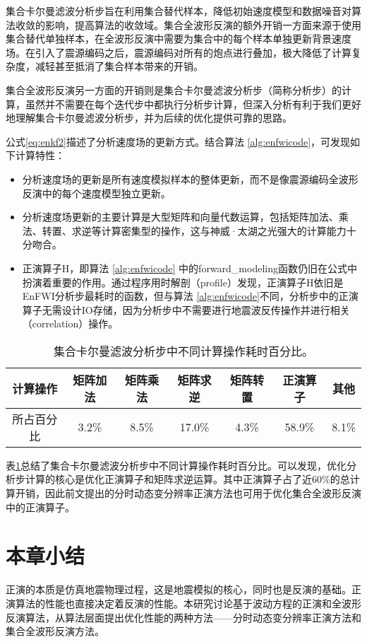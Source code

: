 集合卡尔曼滤波分析步旨在利用集合替代样本，降低初始速度模型和数据噪音对算法收敛的影响，提高算法的收敛域。集合全波形反演的额外开销一方面来源于使用集合替代单独样本，在全波形反演中需要为集合中的每个样本单独更新背景速度场。在引入了震源编码之后，震源编码对所有的炮点进行叠加，极大降低了计算复杂度，减轻甚至抵消了集合样本带来的开销。

集合全波形反演另一方面的开销则是集合卡尔曼滤波分析步（简称分析步）的计算，虽然并不需要在每个迭代步中都执行分析步计算，但深入分析有利于我们更好地理解集合卡尔曼滤波分析步，并为后续的优化提供可靠的思路。

公式\ref{eq:enkf2}描述了分析速度场的更新方式。结合算法 \ref{alg:enfwicode}，可发现如下计算特性：
\begin{itemize}
  \item 分析速度场的更新是所有速度模拟样本的整体更新，而不是像震源编码全波形反演中的每个速度模型独立更新。
  \item 分析速度场更新的主要计算是大型矩阵和向量代数运算，包括矩阵加法、乘法、转置、求逆等计算密集型的操作，这与神威·太湖之光强大的计算能力十分吻合。
  \item 正演算子$\mbox{H}$，即算法 \ref{alg:enfwicode} 中的forward\_modeling函数仍旧在公式中扮演着重要的作用。通过程序用时解剖（profile）发现，正演算子$\mbox{H}$依旧是EnFWI分析步最耗时的函数，但与算法 \ref{alg:enfwicode}不同，分析步中的正演算子无需设计IO存储，因为分析步中不需要进行地震波反传操作并进行相关（correlation）操作。
\end{itemize}

\begin{table}[ht]
\centering
\caption{集合卡尔曼滤波分析步中不同计算操作耗时百分比。}
\label{tb:enkfprofile}
\begin{tabular}{ccccccc}
\hline
计算操作  & 矩阵加法  & 矩阵乘法  & 矩阵求逆   & 矩阵转置  & 正演算子   & 其他    \\\hline
所占百分比 & 3.2\% & 8.5\% & 17.0\% & 4.3\% & 58.9\% & 8.1\% \\\hline
\end{tabular}
\end{table}
表\ref{tb:enkfprofile}总结了集合卡尔曼滤波分析步中不同计算操作耗时百分比。可以发现，优化分析步计算的核心是优化正演算子和矩阵求逆运算。其中正演算子占了近60\%的总计算开销，因此前文提出的分时动态变分辨率正演方法也可用于优化集合全波形反演中的正演算子。



\section{本章小结} %
正演的本质是仿真地震物理过程，这是地震模拟的核心，同时也是反演的基础。正演算法的性能也直接决定着反演的性能。本研究讨论基于波动方程的正演和全波形反演算法，从算法层面提出优化性能的两种方法——分时动态变分辨率正演方法和集合全波形反演方法。

